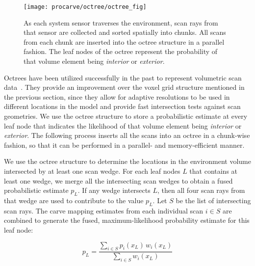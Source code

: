 \documentclass[12pt,onecolumn,oneside]{book}
\begin{document}
\begin{figure}[t]

	\centerline{\texttt{[image: procarve/octree/octree\_fig]}}

	\caption[Diagram of octree population.]{As each system sensor traverses the environment, scan rays from that sensor are collected and sorted spatially into chunks.  All scans from each chunk are inserted into the octree structure in a parallel fashion.  The leaf nodes of the octree represent the probability of that volume element being {\it interior} or {\it exterior}.}
	\label{fig:octree_population}
\end{figure}

Octrees have been utilized successfully in the past to represent volumetric scan data~\cite{Hernandez07,Octomap}.  They provide an improvement over the voxel grid structure mentioned in the previous section, since they allow for adaptive resolutions to be used in different locations in the model and provide fast intersection tests against scan geometries.  We use the octree structure to store a probabilistic estimate at every leaf node that indicates the likelihood of that volume element being {\it interior} or {\it exterior}.  The following process inserts all the scans into an octree in a chunk-wise fashion, so that it can be performed in a parallel- and memory-efficient manner.

We use the octree structure to determine the locations in the environment volume intersected by at least one scan wedge.  For each leaf nodes $L$ that contains at least one wedge, we merge all the intersecting scan wedges to obtain a fused probabilistic estimate $p_L$.  If any wedge intersects $L$, then all four scan rays from that wedge are used to contribute to the value $p_L$.  Let $S$ be the list of intersecting scan rays.  The carve mapping estimates from each individual scan $i \in S$ are combined to generate the fused, maximum-likelihood probability estimate for this leaf node:

\begin{equation}
p_L = \dfrac{\sum\limits_{i \in S} p_i(x_L) \, w_i(x_L) }{ \sum\limits_{i \in S} w_i(x_L) }
\end{equation}
\end{document}
